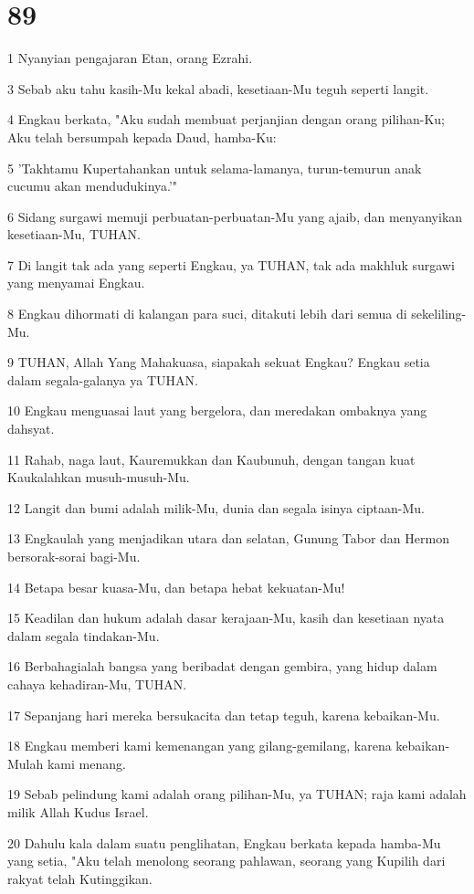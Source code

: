 \chapter{89}

\par 1 Nyanyian pengajaran Etan, orang Ezrahi.
\par 3 Sebab aku tahu kasih-Mu kekal abadi, kesetiaan-Mu teguh seperti langit.
\par 4 Engkau berkata, "Aku sudah membuat perjanjian dengan orang pilihan-Ku; Aku telah bersumpah kepada Daud, hamba-Ku:
\par 5 'Takhtamu Kupertahankan untuk selama-lamanya, turun-temurun anak cucumu akan mendudukinya.'"
\par 6 Sidang surgawi memuji perbuatan-perbuatan-Mu yang ajaib, dan menyanyikan kesetiaan-Mu, TUHAN.
\par 7 Di langit tak ada yang seperti Engkau, ya TUHAN, tak ada makhluk surgawi yang menyamai Engkau.
\par 8 Engkau dihormati di kalangan para suci, ditakuti lebih dari semua di sekeliling-Mu.
\par 9 TUHAN, Allah Yang Mahakuasa, siapakah sekuat Engkau? Engkau setia dalam segala-galanya ya TUHAN.
\par 10 Engkau menguasai laut yang bergelora, dan meredakan ombaknya yang dahsyat.
\par 11 Rahab, naga laut, Kauremukkan dan Kaubunuh, dengan tangan kuat Kaukalahkan musuh-musuh-Mu.
\par 12 Langit dan bumi adalah milik-Mu, dunia dan segala isinya ciptaan-Mu.
\par 13 Engkaulah yang menjadikan utara dan selatan, Gunung Tabor dan Hermon bersorak-sorai bagi-Mu.
\par 14 Betapa besar kuasa-Mu, dan betapa hebat kekuatan-Mu!
\par 15 Keadilan dan hukum adalah dasar kerajaan-Mu, kasih dan kesetiaan nyata dalam segala tindakan-Mu.
\par 16 Berbahagialah bangsa yang beribadat dengan gembira, yang hidup dalam cahaya kehadiran-Mu, TUHAN.
\par 17 Sepanjang hari mereka bersukacita dan tetap teguh, karena kebaikan-Mu.
\par 18 Engkau memberi kami kemenangan yang gilang-gemilang, karena kebaikan-Mulah kami menang.
\par 19 Sebab pelindung kami adalah orang pilihan-Mu, ya TUHAN; raja kami adalah milik Allah Kudus Israel.
\par 20 Dahulu kala dalam suatu penglihatan, Engkau berkata kepada hamba-Mu yang setia, "Aku telah menolong seorang pahlawan, seorang yang Kupilih dari rakyat telah Kutinggikan.
